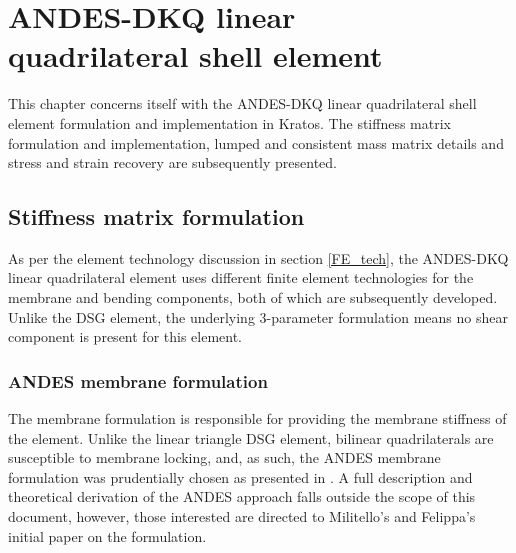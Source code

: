 




\setcounter{MaxMatrixCols}{20}

\chapter[ANDES-DKQ linear quadrilateral shell element]{ANDES-DKQ linear \\ quadrilateral shell element}
\renewcommand{\Thema}{ANDES-DKQ linear quadrilateral shell element}

This chapter concerns itself with the ANDES-DKQ linear quadrilateral shell element formulation and implementation in Kratos. The stiffness matrix formulation and implementation, lumped and consistent mass matrix details and stress and strain recovery are subsequently presented.

\section{Stiffness matrix formulation}

As per the element technology discussion in section \ref{FE_tech}, the ANDES-DKQ linear quadrilateral element uses different finite element technologies for the membrane and bending components, both of which are subsequently developed. Unlike the DSG element, the underlying 3-parameter formulation means no shear component is present for this element.

\subsection{ANDES membrane formulation}

The membrane formulation is responsible for providing the membrane stiffness of the element. Unlike the linear triangle DSG element, bilinear quadrilaterals are susceptible to membrane locking, and, as such, the ANDES membrane formulation was prudentially chosen as presented in \cite{Hau94}. A full description and theoretical derivation of the ANDES approach falls outside the scope of this document, however, those interested are directed to Militello's and Felippa's initial paper \cite{Fel91} on the formulation.

